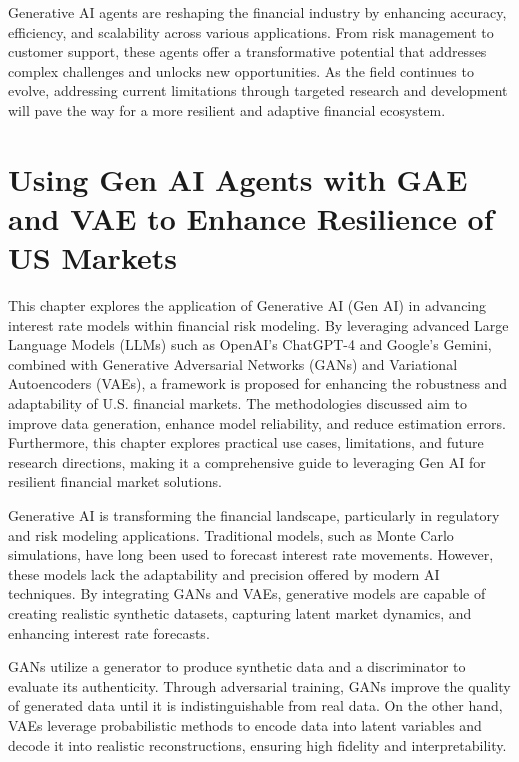\documentclass[a4paper,12pt]{scrbook}
\begin{document}
	
	Generative AI agents are reshaping the financial industry by enhancing accuracy, efficiency, and scalability across various applications. From risk management to customer support, these agents offer a transformative potential that addresses complex challenges and unlocks new opportunities. As the field continues to evolve, addressing current limitations through targeted research and development will pave the way for a more resilient and adaptive financial ecosystem.
	
	
	\chapter{Using Gen AI Agents with GAE and VAE to Enhance Resilience of US Markets}
	
	This chapter explores the application of Generative AI (Gen AI) in advancing interest rate models within financial risk modeling. By leveraging advanced Large Language Models (LLMs) such as OpenAI’s ChatGPT-4 and Google’s Gemini, combined with Generative Adversarial Networks (GANs) and Variational Autoencoders (VAEs), a framework is proposed for enhancing the robustness and adaptability of U.S. financial markets. The methodologies discussed aim to improve data generation, enhance model reliability, and reduce estimation errors. Furthermore, this chapter explores practical use cases, limitations, and future research directions, making it a comprehensive guide to leveraging Gen AI for resilient financial market solutions.
	
	
	Generative AI is transforming the financial landscape, particularly in regulatory and risk modeling applications. Traditional models, such as Monte Carlo simulations, have long been used to forecast interest rate movements. However, these models lack the adaptability and precision offered by modern AI techniques. By integrating GANs and VAEs, generative models are capable of creating realistic synthetic datasets, capturing latent market dynamics, and enhancing interest rate forecasts.
	
	GANs utilize a generator to produce synthetic data and a discriminator to evaluate its authenticity. Through adversarial training, GANs improve the quality of generated data until it is indistinguishable from real data. On the other hand, VAEs leverage probabilistic methods to encode data into latent variables and decode it into realistic reconstructions, ensuring high fidelity and interpretability.
	
\end{document}
